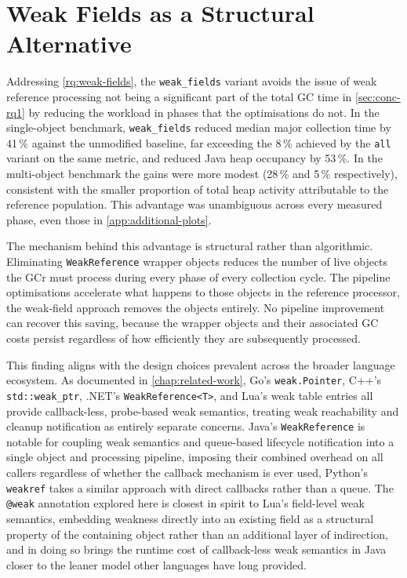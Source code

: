\section{Weak Fields as a Structural Alternative}
\label{sec:conc-rq2}

Addressing \cref{rq:weak-fields}, the \texttt{weak\_fields} variant avoids the issue of weak reference processing not being a significant part of the total \ac{GC} time in \cref{sec:conc-rq1} by reducing the workload in phases that the optimisations do not. In the single-object benchmark, \texttt{weak\_fields} reduced median major collection time by 41\,\% against the unmodified baseline, far exceeding the 8\,\% achieved by the \texttt{all} variant on the same metric, and reduced Java heap occupancy by 53\,\%. In the multi-object benchmark the gains were more modest (28\,\% and 5\,\% respectively), consistent with the smaller proportion of total heap activity attributable to the reference population. This advantage was unambiguous across every measured phase, even those in \cref{app:additional-plots}.

The mechanism behind this advantage is structural rather than algorithmic. Eliminating \texttt{WeakReference} wrapper objects reduces the number of live objects the \ac{GCr} must process during every phase of every collection cycle. The pipeline optimisations accelerate what happens to those objects in the reference processor, the weak-field approach removes the objects entirely. No pipeline improvement can recover this saving, because the wrapper objects and their associated \ac{GC} costs persist regardless of how efficiently they are subsequently processed.

This finding aligns with the design choices prevalent across the broader language ecosystem. As documented in \cref{chap:related-work}, Go's \texttt{weak.Pointer}, C++'s \texttt{std::weak\_ptr}, .NET's \texttt{WeakReference<T>}, and Lua's weak table entries all provide callback-less, probe-based weak semantics, treating weak reachability and cleanup notification as entirely separate concerns. Java's \texttt{WeakReference} is notable for coupling weak semantics and queue-based lifecycle notification into a single object and processing pipeline, imposing their combined overhead on all callers regardless of whether the callback mechanism is ever used, Python's \texttt{weakref} takes a similar approach with direct callbacks rather than a queue. The \texttt{@weak} annotation explored here is closest in spirit to Lua's field-level weak semantics, embedding weakness directly into an existing field as a structural property of the containing object rather than an additional layer of indirection, and in doing so brings the runtime cost of callback-less weak semantics in Java closer to the leaner model other languages have long provided.

